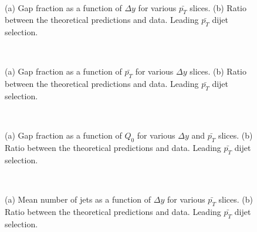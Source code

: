 \begin{figure}
\centering
\mbox{
              \quad
              \quad
}
\caption[Gap fraction as a function of $\Delta y$ for leading $p_T$ dijet selection]{ (a) Gap fraction as a function of $\Delta y$ for various $\bar{p_T}$ slices. (b) Ratio between the theoretical predictions and data. Leading $\bar{p_T}$ dijet selection.
\label{GBJ1:dYSelA}}
\end{figure}



\begin{figure}
\centering
\mbox{
              \quad
              \quad
}
\caption[Gap fraction as a function of $\bar{p_T}$ for leading $p_T$ dijet selection]{ (a) Gap fraction as a function of $\bar{p_T}$ for various $\Delta y$ slices. (b) Ratio between the theoretical predictions and data. Leading $\bar{p_T}$ dijet selection.
\label{GBJ1:pTSelA}}
\end{figure}



\begin{figure}
\centering
\mbox{
              \quad
              \quad
}
\caption[Gap fraction as a function of $Q_0$ for leading $p_T$ dijet selection]{ (a) Gap fraction as a function of $Q_0$ for various $\Delta y$ and $\bar{p_T}$ slices. (b) Ratio between the theoretical predictions and data. Leading $\bar{p_T}$ dijet selection.
\label{GBJ1:Q0SelA}}
\end{figure}

\begin{figure}
\centering
\mbox{
              \quad
              \quad
}
\caption[Mean number of jets as a function of $\Delta y$ for leading $p_T$ dijet selection]{ (a) Mean number of jets as a function of $\Delta y$ for various $\bar{p_T}$ slices. (b) Ratio between the theoretical predictions and data. Leading $\bar{p_T}$ dijet selection.
\label{GBJ1:NjetsdYSelA}}
\end{figure}

